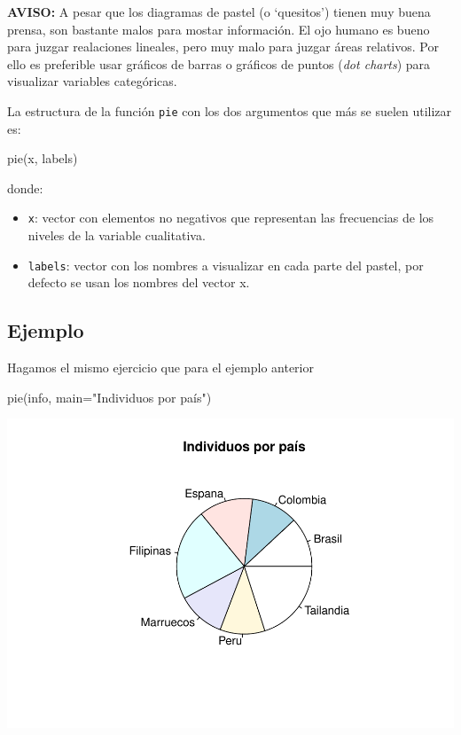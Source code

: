 \documentclass[
]{book}
\newenvironment{Shaded}{\begin{snugshade}}{\end{snugshade}}
\newcommand{\AttributeTok}[1]{\textcolor[rgb]{0.77,0.63,0.00}{#1}}
\newcommand{\FunctionTok}[1]{\textcolor[rgb]{0.00,0.00,0.00}{#1}}
\newcommand{\NormalTok}[1]{#1}
\newcommand{\StringTok}[1]{\textcolor[rgb]{0.31,0.60,0.02}{#1}}
\providecommand{\tightlist}{%
  \setlength{\itemsep}{0pt}\setlength{\parskip}{0pt}}
\begin{document}
\textbf{AVISO:} A pesar que los diagramas de pastel (o `quesitos') tienen muy buena prensa, son bastante malos para mostar información. El ojo humano es bueno para juzgar realaciones lineales, pero muy malo para juzgar áreas relativos. Por ello es preferible usar gráficos de barras o gráficos de puntos (\emph{dot charts}) para visualizar variables categóricas.

La estructura de la función \texttt{pie} con los dos argumentos que más se suelen utilizar es:

\begin{Shaded}
\begin{Highlighting}[]
\FunctionTok{pie}\NormalTok{(x, labels)}
\end{Highlighting}
\end{Shaded}

donde:

\begin{itemize}
\tightlist
\item
  \texttt{x}: vector con elementos no negativos que representan las frecuencias de los niveles de la variable cualitativa.
\item
  \texttt{labels}: vector con los nombres a visualizar en cada parte del pastel, por defecto se usan los nombres del vector x.
\end{itemize}

\hypertarget{ejemplo-12}{%
\subsection*{Ejemplo}\label{ejemplo-12}}

Hagamos el mismo ejercicio que para el ejemplo anterior

\begin{Shaded}
\begin{Highlighting}[]
\FunctionTok{pie}\NormalTok{(info, }\AttributeTok{main=}\StringTok{"Individuos por país"}\NormalTok{)}
\end{Highlighting}
\end{Shaded}

\includegraphics{fig/unnamed-chunk-106-1.pdf}
\end{document}
